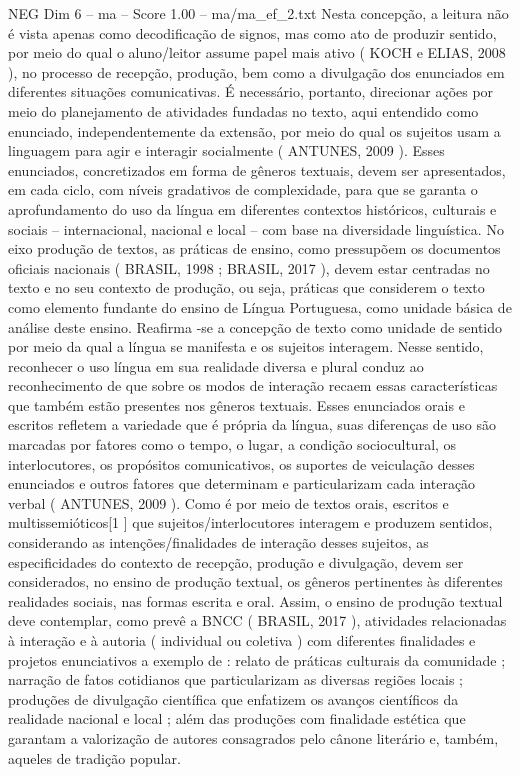 \begin{textsample}{NEG Dim 6 – ma – Score 1.00 – ma/ma\_ef\_2.txt}
Nesta concepção, a leitura não é vista apenas como decodificação de signos, mas como ato de produzir sentido, por meio do qual o aluno/leitor assume papel mais ativo ( KOCH e ELIAS, 2008 ), no processo de recepção, produção, bem como a divulgação dos enunciados em diferentes situações comunicativas.
É necessário, portanto, direcionar ações por meio do planejamento de atividades fundadas no texto, aqui entendido como enunciado, independentemente da extensão, por meio do qual os sujeitos usam a linguagem para agir e interagir socialmente ( ANTUNES, 2009 ).
Esses enunciados, concretizados em forma de gêneros textuais, devem ser apresentados, em cada ciclo, com níveis gradativos de complexidade, para que se garanta o aprofundamento do uso da língua em diferentes contextos históricos, culturais e sociais – internacional, nacional e local – com base na diversidade linguística.
No eixo produção de textos, as práticas de ensino, como pressupõem os documentos oficiais nacionais ( BRASIL, 1998 ; BRASIL, 2017 ), devem estar centradas no texto e no seu contexto de produção, ou seja, práticas que considerem o texto como elemento fundante do ensino de Língua Portuguesa, como unidade básica de análise deste ensino.
Reafirma -se a concepção de texto como unidade de sentido por meio da qual a língua se manifesta e os sujeitos interagem.
Nesse sentido, reconhecer o uso língua em sua realidade diversa e plural conduz ao reconhecimento de que sobre os modos de interação recaem essas características que também estão presentes nos gêneros textuais.
Esses enunciados orais e escritos refletem a variedade que é própria da língua, suas diferenças de uso são marcadas por fatores como o tempo, o lugar, a condição sociocultural, os interlocutores, os propósitos comunicativos, os suportes de veiculação desses enunciados e outros fatores que determinam e particularizam cada interação verbal ( ANTUNES, 2009 ).
Como é por meio de textos orais, escritos e multissemióticos[1 ] que sujeitos/interlocutores interagem e produzem sentidos, considerando as intenções/finalidades de interação desses sujeitos, as especificidades do contexto de recepção, produção e divulgação, devem ser considerados, no ensino de produção textual, os gêneros pertinentes às diferentes realidades sociais, nas formas escrita e oral.
Assim, o ensino de produção textual deve contemplar, como prevê a BNCC ( BRASIL, 2017 ), atividades relacionadas à interação e à autoria ( individual ou coletiva ) com diferentes finalidades e projetos enunciativos a exemplo de : relato de práticas culturais da comunidade ; narração de fatos cotidianos que particularizam as diversas regiões locais ; produções de divulgação científica que enfatizem os avanços científicos da realidade nacional e local ; além das produções com finalidade estética que garantam a valorização de autores consagrados pelo cânone literário e, também, aqueles de tradição popular.

\end{textsample}
